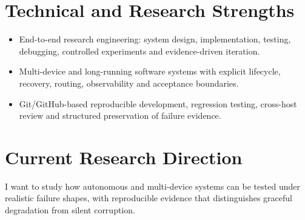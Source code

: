 \documentclass[10pt,a4paper]{article}
\begin{document}
\section{Technical and Research Strengths}
\begin{itemize}
  \item End-to-end research engineering: system design, implementation, testing, debugging, controlled experiments and evidence-driven iteration.
  \item Multi-device and long-running software systems with explicit lifecycle, recovery, routing, observability and acceptance boundaries.
  \item Git/GitHub-based reproducible development, regression testing, cross-host review and structured preservation of failure evidence.
\end{itemize}

\section{Current Research Direction}
I want to study how autonomous and multi-device systems can be tested under realistic failure shapes, with reproducible evidence that distinguishes graceful degradation from silent corruption.
\end{document}
